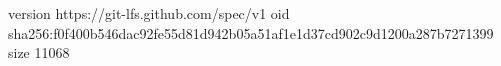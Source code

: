 version https://git-lfs.github.com/spec/v1
oid sha256:f0f400b546dac92fe55d81d942b05a51af1e1d37cd902c9d1200a287b7271399
size 11068
